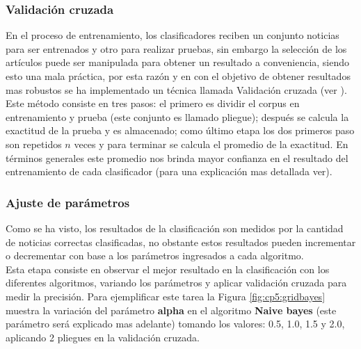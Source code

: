 
\subsubsection{Validación cruzada}

En el proceso de entrenamiento, los clasificadores reciben un conjunto noticias para ser entrenados y otro para realizar pruebas, sin embargo la selección de los artículos puede ser manipulada para obtener un resultado a conveniencia, siendo esto una mala práctica, por esta razón y en con el objetivo de obtener resultados mas robustos se ha implementado un técnica llamada Validación cruzada (ver ).\\

Este método consiste en tres pasos: el primero es dividir el corpus en entrenamiento y prueba (este conjunto es llamado pliegue); después se calcula la exactitud de la prueba y es almacenado; como último etapa los dos primeros paso son repetidos $n$ veces y para terminar  se calcula el promedio de la exactitud. En términos generales este promedio nos brinda mayor confianza en el resultado del entrenamiento de cada clasificador (para una explicación mas detallada ver).\\


\subsubsection{Ajuste de parámetros}

Como se ha visto, los resultados de la clasificación son medidos por la cantidad de noticias correctas clasificadas, no obstante estos resultados pueden incrementar o decrementar con base a los parámetros ingresados a cada algoritmo.\\

Esta etapa consiste en observar el mejor resultado en la clasificación con los diferentes algoritmos, variando los parámetros y aplicar validación cruzada para medir la precisión. Para ejemplificar este tarea la Figura \ref{fig:cp5:gridbayes} muestra la variación del parámetro \textbf{alpha} en el algoritmo \textbf{Naive bayes} (este parámetro será explicado mas adelante) tomando los valores: 0.5, 1.0, 1.5 y 2.0, aplicando 2 pliegues en la validación cruzada.\\


